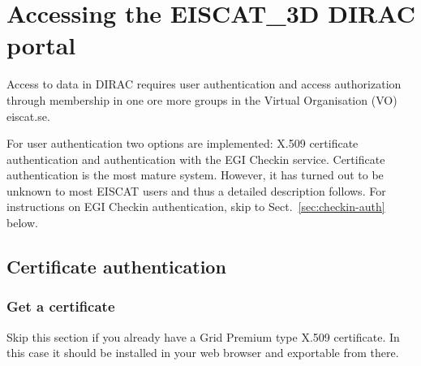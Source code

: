 \documentclass[a4paper]{article}
\newcommand{\etd}{EISCAT\_3D}
\begin{document}
\section{Accessing the \etd{} DIRAC portal}
\label{sec:access}

Access to data in DIRAC requires user authentication and access
authorization through membership in one ore more groups in the Virtual
Organisation (VO) eiscat.se.


For user authentication two options are implemented: X.509 certificate authentication and authentication with the EGI Checkin service.
Certificate authentication is the most mature system. However, it has turned out to be unknown to most EISCAT users and thus a detailed description follows. For instructions on EGI Checkin authentication, skip to Sect.~\ref{sec:checkin-auth} below.


\subsection{Certificate authentication}
\label{sec:cert-auth}


\subsubsection{Get a certificate}
\label{sec:get-certificate}

Skip this section if you already have a Grid Premium type X.509 certificate. In this case it should be installed in your web browser and exportable from there.
\end{document}
